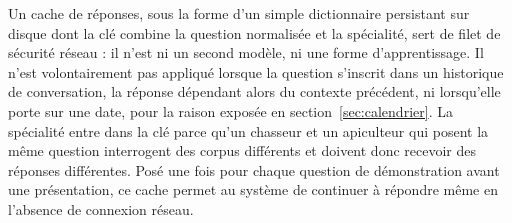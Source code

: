 Un cache de réponses, sous la forme d'un simple dictionnaire persistant sur
disque dont la clé combine la question normalisée et la spécialité, sert de filet
de sécurité réseau : il n'est ni un second modèle, ni une forme d'apprentissage.
Il n'est volontairement pas appliqué lorsque la question s'inscrit dans un
historique de conversation, la réponse dépendant alors du contexte précédent, ni
lorsqu'elle porte sur une date, pour la raison exposée en
section~\ref{sec:calendrier}. La spécialité entre dans la clé parce qu'un
chasseur et un apiculteur qui posent la même question interrogent des corpus
différents et doivent donc recevoir des réponses différentes. Posé une fois pour
chaque question de démonstration avant une présentation, ce cache permet au
système de continuer à répondre même en l'absence de connexion réseau.
